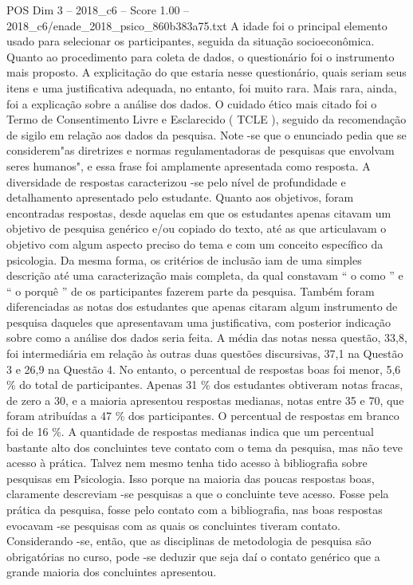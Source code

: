 \begin{textsample}{POS Dim 3 – 2018\_c6 – Score 1.00 – 2018\_c6/enade\_2018\_psico\_860b383a75.txt}
A idade foi o principal elemento usado para selecionar os participantes, seguida da situação socioeconômica.
Quanto ao procedimento para coleta de dados, o questionário foi o instrumento mais proposto.
A explicitação do que estaria nesse questionário, quais seriam seus itens e uma justificativa adequada, no entanto, foi muito rara.
Mais rara, ainda, foi a explicação sobre a análise dos dados.
O cuidado ético mais citado foi o Termo de Consentimento Livre e Esclarecido ( TCLE ), seguido da recomendação de sigilo em relação aos dados da pesquisa.
Note -se que o enunciado pedia que se considerem"as diretrizes e normas regulamentadoras de pesquisas que envolvam seres humanos", e essa frase foi amplamente apresentada como resposta.
A diversidade de respostas caracterizou -se pelo nível de profundidade e detalhamento apresentado pelo estudante.
Quanto aos objetivos, foram encontradas respostas, desde aquelas em que os estudantes apenas citavam um objetivo de pesquisa genérico e/ou copiado do texto, até as que articulavam o objetivo com algum aspecto preciso do tema e com um conceito específico da psicologia.
Da mesma forma, os critérios de inclusão iam de uma simples descrição até uma caracterização mais completa, da qual constavam “ o como ” e “ o porquê ” de os participantes fazerem parte da pesquisa.
Também foram diferenciadas as notas dos estudantes que apenas citaram algum instrumento de pesquisa daqueles que apresentavam uma justificativa, com posterior indicação sobre como a análise dos dados seria feita.
A média das notas nessa questão, 33,8, foi intermediária em relação às outras duas questões discursivas, 37,1 na Questão 3 e 26,9 na Questão 4.
No entanto, o percentual de respostas boas foi menor, 5,6 \% do total de participantes.
Apenas 31 \% dos estudantes obtiveram notas fracas, de zero a 30, e a maioria apresentou respostas medianas, notas entre 35 e 70, que foram atribuídas a 47 \% dos participantes.
O percentual de respostas em branco foi de 16 \%.
A quantidade de respostas medianas indica que um percentual bastante alto dos concluintes teve contato com o tema da pesquisa, mas não teve acesso à prática.
Talvez nem mesmo tenha tido acesso à bibliografia sobre pesquisas em Psicologia.
Isso porque na maioria das poucas respostas boas, claramente descreviam -se pesquisas a que o concluinte teve acesso.
Fosse pela prática da pesquisa, fosse pelo contato com a bibliografia, nas boas respostas evocavam -se pesquisas com as quais os concluintes tiveram contato.
Considerando -se, então, que as disciplinas de metodologia de pesquisa são obrigatórias no curso, pode -se deduzir que seja daí o contato genérico que a grande maioria dos concluintes apresentou.

\end{textsample}
